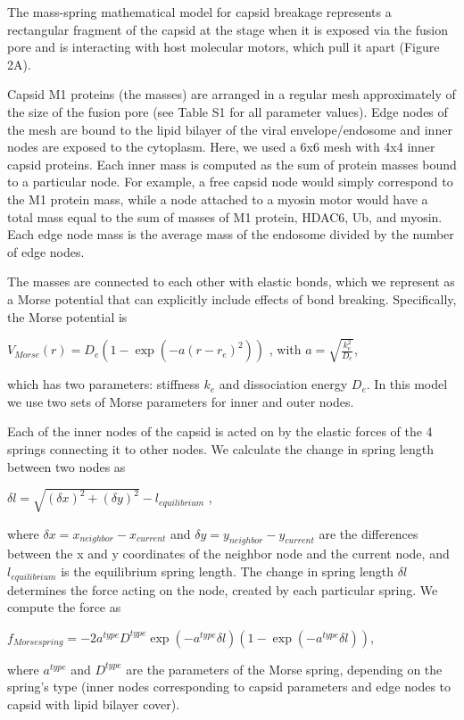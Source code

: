 The mass-spring mathematical model for capsid breakage represents a rectangular fragment of the capsid at the stage when it is exposed via the fusion pore and is interacting with host molecular motors, which pull it apart (Figure 2A).

Capsid M1 proteins (the masses) are arranged in a regular mesh approximately of the size of the fusion pore (see Table S1 for all parameter values). Edge nodes of the mesh are bound to the lipid bilayer of the viral envelope/endosome and inner nodes are exposed to the cytoplasm. Here, we used a 6x6 mesh with 4x4 inner capsid proteins. Each inner mass is computed as the sum of protein masses bound to a particular node. For example, a free capsid node would simply correspond to the M1 protein mass, while a node attached to a myosin motor would have a total mass equal to the sum of masses of M1 protein, HDAC6, Ub, and myosin. Each edge node mass is the average mass of the endosome divided by the number of edge nodes.

The masses are connected to each other with elastic bonds, which we represent as a Morse potential that can explicitly include effects of bond breaking. Specifically, the Morse potential is

$V_{Morse} (r) = D_e (1 - \exp(-a(r - r_e)^2))$ , with  $a = \sqrt{\frac{k^2_e}{D_e}}$,

which has two parameters: stiffness $k_e$ and dissociation energy $D_e$. In this model we use two sets of Morse parameters for inner and outer nodes.

Each of the inner nodes of the capsid is acted on by the elastic forces of the 4 springs connecting it to other nodes. We calculate the change in spring length between two nodes as

$\delta l = \sqrt{(\delta x)^2 + (\delta y)^2} - l_{equilibrium}$ ,
 
where $\delta x = x_{neighbor} - x_{current}$ and $\delta y = y_{neighbor} - y_{current}$ are the differences between the x and y coordinates of the neighbor node and the current node, and $l_{equilibrium}$ is the equilibrium spring length. The change in spring length $\delta l$ determines the force acting on the node, created by each particular spring. We compute the force as

$f_{Morse spring} = -2 a^{type} D^{type} \exp(-a^{type} \delta l) (1 - \exp(-a^{type} \delta l))$,
 
where $a^{type}$ and $D^{type}$ are the parameters of the Morse spring, depending on the spring’s type (inner nodes corresponding to capsid parameters and edge nodes to capsid with lipid bilayer cover).

